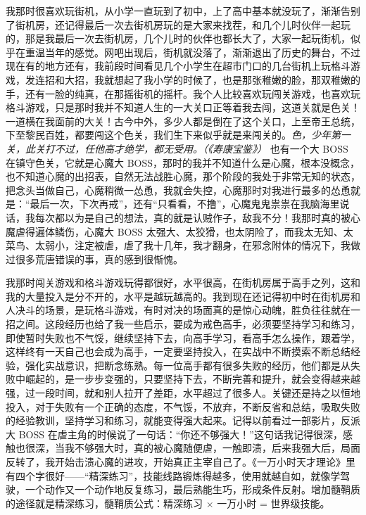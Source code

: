 我那时很喜欢玩街机，从小学一直玩到了初中，上了高中基本就没玩了，渐渐告别了街机房，还记得最后一次去街机房玩的是大家来找茬，和几个儿时伙伴一起玩的，那是我最后一次去街机房，几个儿时的伙伴也都长大了，大家一起玩街机，似乎在重温当年的感觉。网吧出现后，街机就没落了，渐渐退出了历史的舞台，不过现在有的地方还有，我前段时间看见几个小学生在超市门口的几台街机上玩格斗游戏，发连招和大招，我就想起了我小学的时候了，也是那张稚嫩的脸，那双稚嫩的手，还有一脸的纯真，在那摇街机的摇杆。我个人比较喜欢玩闯关游戏，也喜欢玩格斗游戏，只是那时我并不知道人生的一大关口正等着我去闯，这道关就是色关！一道横在我面前的大关！古今中外，多少人都是倒在了这个关口，上至帝王总统，下至黎民百姓，都要闯这个色关，我们生下来似乎就是来闯关的。\textit{色，少年第一关，此关打不过，任他高才绝学，都无受用。（《寿康宝鉴》）} 也有一个大 BOSS 在镇守色关，它就是心魔大 BOSS，那时的我并不知道什么是心魔，根本没概念，也不知道心魔的出招表，自然无法战胜心魔，那个阶段的我处于非常无知的状态，把念头当做自己，心魔稍微一怂恿，我就会失控，心魔那时对我进行最多的怂恿就是：“最后一次，下次再戒”，还有“只看看，不撸”，心魔鬼鬼祟祟在我脑海里说话，我每次都以为是自己的想法，真的就是认贼作子，敌我不分！我那时真的被心魔虐得遍体鳞伤，心魔大 BOSS 太强大、太狡猾，也太阴险了，而我太无知、太菜鸟、太弱小，注定被虐，虐了我十几年，我才翻身，在邪念附体的情况下，我做过很多荒唐错误的事，真的感到很惭愧。

我那时闯关游戏和格斗游戏玩得都很好，水平很高，在街机房属于高手之列，这和我的大量投入是分不开的，水平是越玩越高的。我到现在还记得初中时在街机房和人决斗的场景，是玩格斗游戏，有时对决的场面真的是惊心动魄，胜负往往就在一招之间。这段经历也给了我一些启示，要成为戒色高手，必须要坚持学习和练习，即使暂时失败也不气馁，继续坚持下去，向高手学习，看高手怎么操作，跟着学，这样终有一天自己也会成为高手，一定要坚持投入，在实战中不断摸索不断总结经验，强化实战意识，把断念练熟。每一位高手都有很多失败的经历，他们都是从失败中崛起的，是一步步变强的，只要坚持下去，不断完善和提升，就会变得越来越强，过一段时间，就和别人拉开了差距，水平超过了很多人。关键还是持之以恒地投入，对于失败有一个正确的态度，不气馁，不放弃，不断反省和总结，吸取失败的经验教训，坚持学习和练习，就能变得强大起来。记得以前看过一部影片，反派大 BOSS 在虐主角的时候说了一句话：“你还不够强大！”这句话我记得很深，感触也很深，当我不够强大时，真的被心魔随便虐，一触即溃，后来我强大后，局面反转了，我开始击溃心魔的进攻，开始真正主宰自己了。《一万小时天才理论》里有四个字很好——“精深练习”，技能线路锻炼得越多，使用就越自如，就像学驾驶，一个动作又一个动作地反复练习，最后熟能生巧，形成条件反射。增加髓鞘质的途径就是精深练习，髓鞘质公式：精深练习 $\times$ 一万小时 = 世界级技能。

